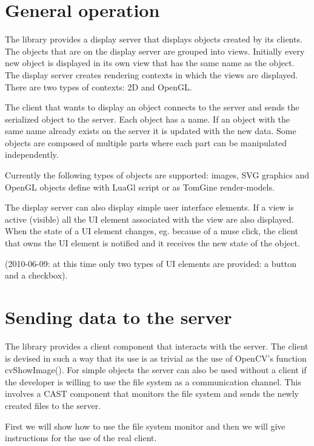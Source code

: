 \section{General operation}

The library provides a display server that displays objects created by its
clients.  The objects that are on the display server are grouped into views.
Initially every new object is displayed in its own view that has the same name
as the object.
The display server creates rendering contexts in which the views are displayed.
There are two types of contexts: 2D and OpenGL.

The client that wants to display an object connects to the server and sends the
serialized object to the server. Each object has a name. If an object with the
same name already exists on the server it is updated with the new data. Some
objects are composed of multiple parts where each part can be manipulated
independently.

Currently the following types of objects are supported: images, SVG graphics and
OpenGL objects define with LuaGl script or as TomGine render-models. 

The display server can also display simple user interface elements. If a view
is active (visible) all the UI element associated with the view are also
displayed. When the state of a UI element changes, eg.  because of a muse
click, the client that owns the UI element is notified and it receives the new
state of the object.

(2010-06-09: at this time only two types of UI elements are provided: a button
and a checkbox).

\section{Sending data to the server}

The library provides a client component that interacts with the server. The
client is devised in such a way that its use is as trivial as the use of
OpenCV's function cvShowImage(). For simple objects the server can also
be used without a client if the developer is willing to use the file system
as a communication channel. This involves a CAST component that monitors
the file system and sends the newly created files to the server.

First we will show how to use the file system monitor and then we will give
instructions for the use of the real client.

